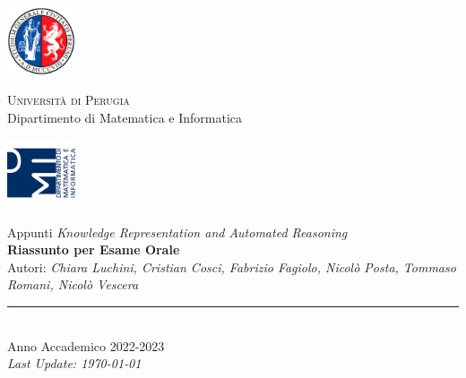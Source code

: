 
\thispagestyle{empty} %

\noindent %
\includegraphics[width=0.15\textwidth]{frontmatter/imgs/logoUniPg.jpg}
\begin{minipage}[b]{0.7\textwidth}
    \centering
    {\Large \textsc{Universit{\`a} di Perugia}}\\
    \vspace{0.4 em}
    {\large Dipartimento di Matematica e Informatica}
    \vspace{0.6 em}
\end{minipage}%
\includegraphics[width=0.15\textwidth]{frontmatter/imgs/logoDMI.jpg}

\vspace{8 em}

\begin{center}
    {\Huge Appunti \textit{Knowledge Representation and Automated Reasoning}}\\
    \vspace{5 em}
    {\Huge \textbf{Riassunto per Esame Orale}}\\
    \vspace{10 em}
    {\small Autori: \textit{Chiara Luchini, Cristian Cosci, Fabrizio Fagiolo,
            Nicolò Posta, Tommaso Romani, Nicolò Vescera}}\\
    \vfill

    \rule{380pt}{.4pt}\\
    \vspace{1.2 em}
    \large{Anno Accademico 2022-2023}\\ %
    \vspace{.9 em}
    \small{\textit{Last Update: \today{}}}
\end{center}

